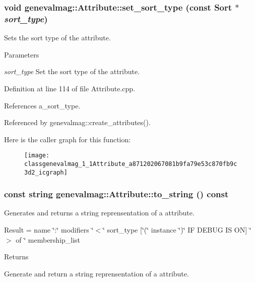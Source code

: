 \hypertarget{classgenevalmag_1_1Attribute_a871202067081b9fa79e53c870fb9c3d2}{
\subsubsection[{set\_\-sort\_\-type}]{\setlength{\rightskip}{0pt plus 5cm}void genevalmag::Attribute::set\_\-sort\_\-type (const {\bf Sort} $\ast$ {\em sort\_\-type})}}
\label{classgenevalmag_1_1Attribute_a871202067081b9fa79e53c870fb9c3d2}
Sets the sort type of the attribute. 
\begin{DoxyParams}{Parameters}
\item[{\em sort\_\-type}]Set the sort type of the attribute. \end{DoxyParams}


Definition at line 114 of file Attribute.cpp.



References a\_\-sort\_\-type.



Referenced by genevalmag::create\_\-attributes().



Here is the caller graph for this function:\nopagebreak
\begin{figure}[H]
\begin{center}
\leavevmode
\texttt{[image: classgenevalmag\_1\_1Attribute\_a871202067081b9fa79e53c870fb9c3d2\_icgraph]}
\end{center}
\end{figure}


\hypertarget{classgenevalmag_1_1Attribute_a27c1b94db4a836b9fcda1d26146d1db6}{
\subsubsection[{to\_\-string}]{\setlength{\rightskip}{0pt plus 5cm}const string genevalmag::Attribute::to\_\-string () const}}
\label{classgenevalmag_1_1Attribute_a27c1b94db4a836b9fcda1d26146d1db6}
Generates and returns a string reprensentation of a attribute.\par
 \par
 Result = name \char`\"{}:\char`\"{} modifiers \char`\"{}$<$\char`\"{} sort\_\-type \mbox{[}\char`\"{}(\char`\"{} instance \char`\"{})\char`\"{} IF DEBUG IS ON\mbox{]} \char`\"{}$>$ of \char`\"{} membership\_\-list\par
 \par
 \begin{DoxyReturn}{Returns}

\end{DoxyReturn}
Generate and return a string reprensentation of a attribute.

